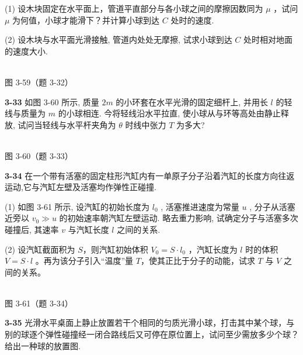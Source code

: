 (1) 设木块固定在水平面上，管道平直部分与各小球之间的摩擦因数同为 $\mu$ ，试问 $\mu$ 为何值，小球才能滑下？并计算小球到达 $C$ 处时的速度.

(2) 设木块与水平面光滑接触, 管道内处处无摩擦, 试求小球到达 $C$ 处时相对地面的速度大小.

\begin{center}
\resizebox{0.40\textwidth}{!}{}\\[4pt]
{\small 图 3-59（题 3-32）}
\end{center}

\newpage

\textbf{3-33} 如图 3-60 所示, 质量 $2m$ 的小环套在水平光滑的固定细杆上, 并用长 $l$ 的轻线与质量为 $m$ 的小球相连. 今将轻线沿水平拉直, 使小球从与环等高处由静止释放, 试问当轻线与水平杆夹角为 $\theta$ 时线中张力 $T$ 为多大?

\begin{center}
\resizebox{0.36\textwidth}{!}{}\\[4pt]
{\small 图 3-60（题 3-33）}
\end{center}

\newpage

\textbf{3-34} 在一个带有活塞的固定柱形汽缸内有一单原子分子沿着汽缸的长度方向往返运动,它与汽缸左壁及活塞均作弹性正碰撞.

(1) 如图 3-61 所示, 设汽缸的初始长度为 $l_{0}$ , 活塞推进速度为常量 $u$ , 分子从活塞近旁以 $v_{0} \gg u$ 的初始速率朝汽缸左壁运动. 略去重力影响, 试确定分子与活塞多次碰撞后, 其速率 $v$ 与汽缸长度 $l$ 之间的关系.

(2) 设汽缸截面积为 $S$，则汽缸初始体积 $V_{0}=S \cdot l_{0}$ ，汽缸长度为 $l$ 时的体积 $V=S \cdot l$ 。再为该分子引入“温度”量 $T$，使其正比于分子的动能，试求 $T$ 与 $V$ 之间的关系。

\begin{center}
\resizebox{0.42\textwidth}{!}{}\\[4pt]
{\small 图 3-61（题 3-34）}
\end{center}

\newpage

\textbf{3-35} 光滑水平桌面上静止放置若干个相同的匀质光滑小球，打击其中某个球，与别的球逐个弹性碰撞经一闭合路线后又可停在原位置上，试问至少需放多少个球？给出一种球的放置图.

\newpage

